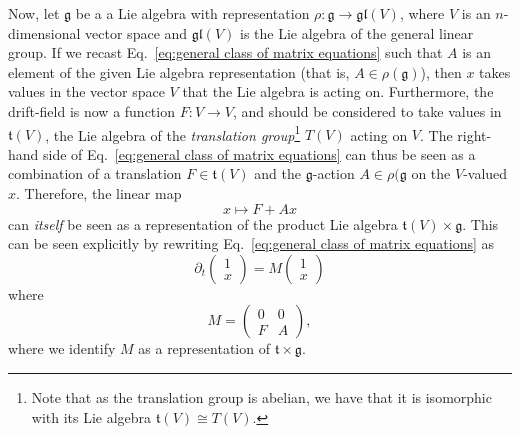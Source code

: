 Now, let $\mathfrak{g}$ be a a Lie algebra with representation $\rho : \mathfrak{g} \to \mathfrak{gl}(V)$, where $V$ is an $n$-dimensional vector space and $\mathfrak{gl}(V)$ is the Lie algebra of the general linear group. If we recast Eq.~\ref{eq:general class of matrix equations} such that $A$ is an element of the given Lie algebra representation (that is, $A \in \rho(\mathfrak{g})$), then $x$ takes values in the vector space $V$ that the Lie algebra is acting on. Furthermore, the drift-field is now a function $F : V \to V$, and should be considered to take values in $\mathfrak{t}(V)$, the Lie algebra of the \textit{translation group}\footnote{Note that as the translation group is abelian, we have that it is isomorphic with its Lie algebra $\mathfrak{t}(V) \cong T(V)$.} $T(V)$ acting on $V$. The right-hand side of Eq.~\ref{eq:general class of matrix equations} can thus be seen as a combination of a translation $F \in \mathfrak{t}(V)$ and the $\mathfrak{g}$-action $A\in \rho(\mathfrak{g}$ on the $V$-valued $x$. Therefore, the linear map
\begin{equation}
	x \mapsto F + Ax
\end{equation}
can \textit{itself} be seen as a representation of the product Lie algebra $\mathfrak{t}(V) \times \mathfrak{g}$. This can be seen explicitly by rewriting Eq.~\ref{eq:general class of matrix equations} as
\begin{equation} \label{eq:recast matrix equation}
	\partial_t \begin{pmatrix}
		1 \\ x
	\end{pmatrix} = M \begin{pmatrix}
		1 \\ x
	\end{pmatrix}
\end{equation} 
where
\begin{equation}
	M = \begin{pmatrix}
		0 & 0 \\
		F & A
	\end{pmatrix},
\end{equation}
where we identify $M$ as a representation of $\mathfrak{t} \times \mathfrak{g}$.

